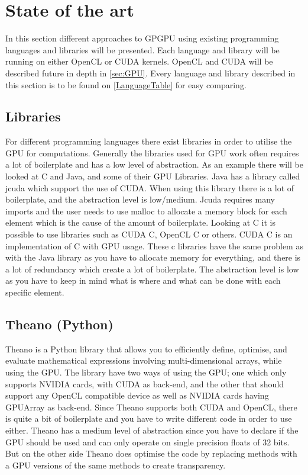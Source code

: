 \section{State of the art} %
\label{sec:state_of_the_art}
In this section different approaches to GPGPU using existing programming languages and libraries will be presented.
Each language and library will be running on either OpenCL or CUDA kernels.
OpenCL and CUDA will be described future in depth in \ref{sec:GPU}.
Every language and library described in this section is to be found on \ref{LanguageTable} for easy comparing.
      
\subsection{Libraries} 
For different programming languages there exist libraries in order to utilise the GPU for computations.
Generally the libraries used for GPU work often requires a lot of boilerplate and has a low level of abstraction.
As an example there will be looked at C and Java, and some of their GPU Libraries.
Java has a library called jcuda which support the use of CUDA.
When using this library there is a lot of boilerplate, and the abstraction level is low/medium\citep{Java_library}. 
Jcuda requires many imports and the user needs to use malloc to allocate a memory block for each element which is the cause of the amount of boilerplate.\citep{Java_malloc}
Looking at C it is possible to use libraries such as CUDA C, OpenCL C or others.
CUDA C is an implementation of C with GPU usage.
These c libraries have the same problem as with the Java library as you have to allocate memory for everything, and there is a lot of redundancy which create a lot of boilerplate.
The abstraction level is low as you have to keep in mind what is where and what can be done with each specific element.\citep{C_CUDA}
                                                  

\subsection{Theano (Python)}
Theano is a Python library that allows you to efficiently define, optimise, and evaluate mathematical expressions involving multi-dimensional arrays, while using the GPU.
The library have two ways of using the GPU; one which only supports NVIDIA cards, with CUDA as back-end, and the other that should support any OpenCL compatible device as well as NVIDIA cards having GPUArray as back-end.
Since Theano supports both CUDA and OpenCL, there is quite a bit of boilerplate and you have to write different code in order to use either.
Theano has a medium level of abstraction since you have to declare if the GPU should be used and can only operate on single precision floats of 32 bits.
But on the other side Theano does optimise the code by replacing methods with a GPU versions of the same methods to create transparency.\citep{Theano,Theano_GPU}

